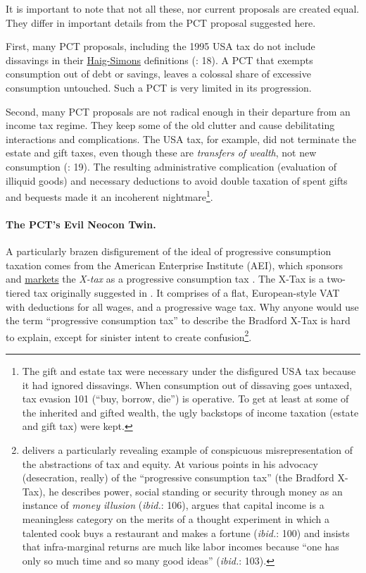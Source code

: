It is important to note that not all these, nor current proposals are created equal. They differ in important details from the PCT proposal suggested here. 

First, many PCT proposals, including the 1995 USA tax do not include dissavings in their \hyperref[eq:HaigSimonsPCT]{Haig-Simons} definitions (\citealt{Bank2004}: 18). A PCT that exempts consumption out of debt or savings, leaves a colossal share of excessive consumption untouched. Such a PCT is very limited in its progression.

Second, many PCT proposals are not radical enough in their departure from an income tax regime. They keep some of the old clutter and cause debilitating interactions and complications. The USA tax, for example, did not terminate the estate and gift taxes, even though these are \emph{transfers of wealth}, not new consumption (\citealt{Bank2004}: 19). The resulting administrative complication (evaluation of illiquid goods) and necessary deductions to avoid double taxation of spent gifts and bequests made it an incoherent nightmare\footnote{
	The gift and estate tax were necessary under the disfigured USA tax because it had ignored dissavings. When consumption out of dissaving goes untaxed, tax evasion 101 (``buy, borrow, die'') is operative. To get at least at some of the inherited and gifted wealth, the ugly backstops of income taxation (estate and gift tax) were kept.}.

\paragraph{The PCT's Evil Neocon Twin.} A particularly brazen disfigurement of the ideal of progressive consumption taxation comes from the American Enterprise Institute (AEI), which sponsors and \hyperref[http://www.aei.org/outlook/29082]{markets} the \emph{\citeauthor{Bradford} X-tax} as a progressive consumption tax \citep{Bradford}. The \citeauthor{Bradford1986} X-Tax is a two-tiered tax originally suggested in \citeyear{Bradford1986}. It comprises of a flat, European-style VAT with deductions for all wages, and a progressive wage tax. 
Why anyone would use the term ``progressive consumption tax'' to describe the Bradford X-Tax is hard to explain, except for sinister intent to create confusion\footnote{
	\cite{Shaviro2004} delivers a particularly revealing example of conspicuous misrepresentation of the abstractions of tax and equity. At various points in his advocacy (desecration, really) of the ``progressive consumption tax'' (the Bradford X-Tax), he describes power, social standing or security through money as an instance of \emph{money illusion} (\emph{ibid.}: 106), argues that capital income is a meaningless category on the merits of a thought experiment in which a talented cook buys a restaurant and makes a fortune (\emph{ibid.}: 100) and insists that infra-marginal returns are much like labor incomes because ``one has only so much time and so many good ideas'' (\emph{ibid.}: 103).}.
 
